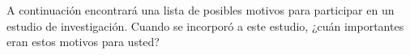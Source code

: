 \documentclass[spanish,pagemark,stamp,oneside,print_questionnaire_id]{sdapsclassic}
\begin{document}
\begin{questionnaire}
\begin{Form}
\begin{optiongroup}{A continuación encontrará una lista de posibles motivos para participar en un estudio de investigación. Cuando se incorporó a este estudio, ¿cuán importantes eran estos motivos para usted?}
                    
                    
                    
                    
                    
                    
                            \end{optiongroup}
                        

\end{Form}
\end{questionnaire}
\end{document}
